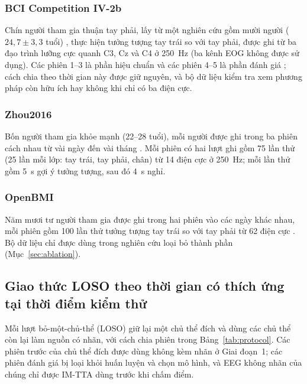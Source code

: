 \documentclass[preprint,12pt]{elsarticle}
\begin{document}
\subsubsection{BCI Competition IV-2b}
\label{subsec:bcic2b}

Chín người tham gia thuận tay phải, lấy từ một nghiên cứu gồm mười người ($24,7\pm3,3$ tuổi) \cite{leeb2007virtual}, thực hiện tưởng tượng tay trái so với tay phải, được ghi từ ba đạo trình lưỡng cực quanh C3, Cz và C4 ở 250~Hz (ba kênh EOG không được sử dụng). Các phiên 1--3 là phần hiệu chuẩn và các phiên 4--5 là phần đánh giá \cite{tangermann2012review}; cách chia theo thời gian này được giữ nguyên, và bộ dữ liệu kiểm tra xem phương pháp còn hữu ích hay không khi chỉ có ba điện cực.

\subsubsection{Zhou2016}
\label{subsec:zhou2016}

Bốn người tham gia khỏe mạnh (22--28 tuổi), mỗi người được ghi trong ba phiên cách nhau từ vài ngày đến vài tháng \cite{zhou2016trialselection}. Mỗi phiên có hai lượt ghi gồm 75 lần thử (25 lần mỗi lớp: tay trái, tay phải, chân) từ 14 điện cực ở 250~Hz; mỗi lần thử gồm 5~s gợi ý tưởng tượng, sau đó 4~s nghỉ.

\subsubsection{OpenBMI}
\label{subsec:openbmi}

Năm mươi tư người tham gia được ghi trong hai phiên vào các ngày khác nhau, mỗi phiên gồm 100 lần thử tưởng tượng tay trái so với tay phải từ 62 điện cực \cite{lee2019openbmi}. Bộ dữ liệu chỉ được dùng trong nghiên cứu loại bỏ thành phần (Mục~\ref{sec:ablation}).

\subsection{Giao thức LOSO theo thời gian có thích ứng tại thời điểm kiểm thử}
\label{subsec:clean_protocol}

Mỗi lượt bỏ-một-chủ-thể (LOSO) giữ lại một chủ thể đích và dùng các chủ thể còn lại làm nguồn có nhãn, với cách chia phiên trong Bảng~\ref{tab:protocol}. Các phiên trước của chủ thể đích được dùng không kèm nhãn ở Giai đoạn~1; các phiên đánh giá bị loại khỏi huấn luyện và chọn mô hình, và EEG không nhãn của chúng chỉ được IM-TTA dùng trước khi chấm điểm.
\end{document}
